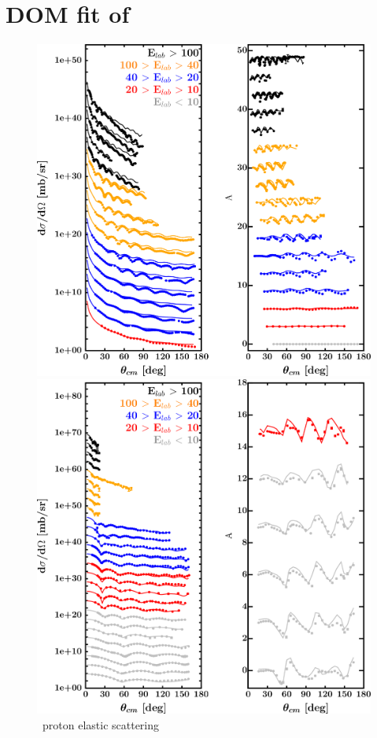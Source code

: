 \section{DOM fit of \pbEight}
\label{pb208DOMOutput}
\begin{figure}[hbtp]
    \centering
    \begin{minipage}{0.47\textwidth}
        \centering
        \includegraphics[width=\textwidth]{figures/pb208_protonElastic.png}
        \caption*{\pbEight\ proton elastic scattering}
        \label{DOMFitData_pb208_proton_elastic}
    \end{minipage}\hspace{6pt}
    \begin{minipage}{0.47\textwidth}
        \centering
        \includegraphics[width=\textwidth]{figures/pb208_neutronElastic.png}

\end{minipage}
\end{figure}
